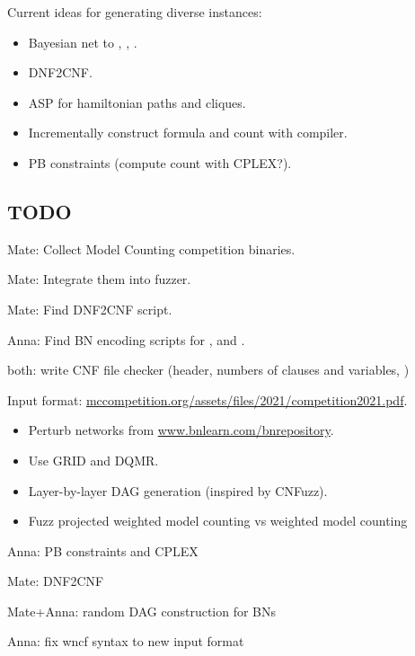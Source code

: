 \documentclass[a4paper]{tufte-handout}
\begin{document}
	Current ideas for generating diverse instances:
	
	\begin{itemize}
		\item Bayesian net to \darohtwo{}, \sbkohfive{}, \bklmsixteen{}.
		\item DNF2CNF.
		\item ASP for hamiltonian paths and cliques.
		\item Incrementally construct formula and count with compiler.
		\item PB constraints (compute count with CPLEX?).
	\end{itemize}
	
	\subsection*{TODO}
	\begin{todolist}
		\item Mate: Collect Model Counting competition binaries.
		\item Mate: Integrate them into fuzzer.
		\item Mate: Find DNF2CNF script.
		\item Anna: Find BN encoding scripts for \darohtwo{}, \sbkohfive{} and \bklmsixteen{}.
		\item both: write CNF file checker (header, numbers of clauses and variables, \etc{})
	\end{todolist}

	
	\noindent\hrulefill
	
	
	\newday{Thu 9 Nov 2022: Anna \& Mate}
	
	Input format: \href{https://mccompetition.org/assets/files/2021/competition2021.pdf}{mccompetition.org/assets/files/2021/competition2021.pdf}.
	
	\begin{itemize}
		\item Perturb networks from \href{https://www.bnlearn.com/bnrepository/}{www.bnlearn.com/bnrepository}.
		\item Use GRID and DQMR.
		\item Layer-by-layer DAG generation (inspired by CNFuzz).
		\item Fuzz projected weighted model counting vs weighted model counting
	\end{itemize}

	\begin{todolist}
		\item Anna: PB constraints and CPLEX
		\item Mate: DNF2CNF
		\item Mate+Anna: random DAG construction for BNs
		\item Anna: fix wncf syntax to new input format
	\end{todolist}
\end{document}
